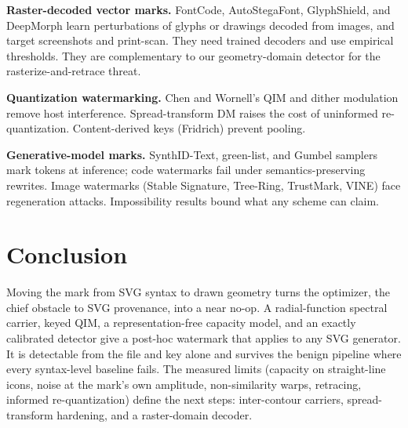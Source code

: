 \documentclass[10pt,twocolumn]{article}
\begin{document}
\textbf{Raster-decoded vector marks.} FontCode, AutoStegaFont, GlyphShield, and DeepMorph learn perturbations of glyphs or drawings decoded from images, and target screenshots and print-scan. They need trained decoders and use empirical thresholds. They are complementary to our geometry-domain detector for the rasterize-and-retrace threat.

\textbf{Quantization watermarking.} Chen and Wornell's QIM and dither modulation remove host interference. Spread-transform DM raises the cost of uninformed re-quantization. Content-derived keys (Fridrich) prevent pooling.

\textbf{Generative-model marks.} SynthID-Text, green-list, and Gumbel samplers mark tokens at inference; code watermarks fail under semantics-preserving rewrites. Image watermarks (Stable Signature, Tree-Ring, TrustMark, VINE) face regeneration attacks. Impossibility results bound what any scheme can claim.

\section{Conclusion}
Moving the mark from SVG syntax to drawn geometry turns the optimizer, the chief obstacle to SVG provenance, into a near no-op. A radial-function spectral carrier, keyed QIM, a representation-free capacity model, and an exactly calibrated detector give a post-hoc watermark that applies to any SVG generator. It is detectable from the file and key alone and survives the benign pipeline where every syntax-level baseline fails. The measured limits (capacity on straight-line icons, noise at the mark's own amplitude, non-similarity warps, retracing, informed re-quantization) define the next steps: inter-contour carriers, spread-transform hardening, and a raster-domain decoder.
\end{document}
